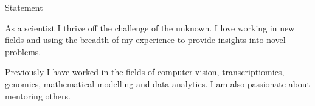 \begin{rubric}{Statement}
\end{rubric}
    \vspace{-0.5cm}
    As a scientist I thrive off the challenge of the unknown. I love working in
    new fields and using the breadth of my experience to provide insights into
    novel problems.  

    \vspace{0.2cm}

    Previously I have worked in the fields of computer vision, transcriptiomics,
    genomics, mathematical modelling and data analytics. I am also passionate
    about mentoring others.


